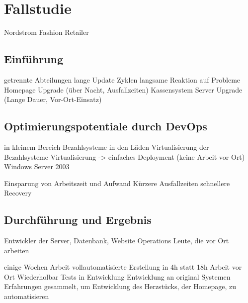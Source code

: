 \section{Fallstudie} %
Nordstrom Fashion Retailer

\subsection{Einführung}
getrennte Abteilungen
lange Update Zyklen
langsame Reaktion auf Probleme
Homepage Upgrade (über Nacht, Ausfallzeiten)
Kassensystem Server Upgrade (Lange Dauer, Vor-Ort-Einsatz)

\subsection{Optimierungspotentiale durch DevOps}
in kleinem Bereich
Bezahlsysteme in den Läden
Virtualisierung der Bezahlsysteme
Virtualisierung -> einfaches Deployment (keine Arbeit vor Ort)
Windows Server 2003

Einsparung von Arbeitszeit und Aufwand
Kürzere Ausfallzeiten
schnellere Recovery

\subsection{Durchführung und Ergebnis}
Entwickler der Server, Datenbank, Website
Operations Leute, die vor Ort arbeiten

einige Wochen Arbeit
vollautomatisierte Erstellung in 4h statt 18h Arbeit vor Ort
Wiederholbar
Tests in Entwicklung
Entwicklung an original Systemen
Erfahrungen gesammelt, um Entwicklung des Herzstücks, der Homepage, zu automatisieren
